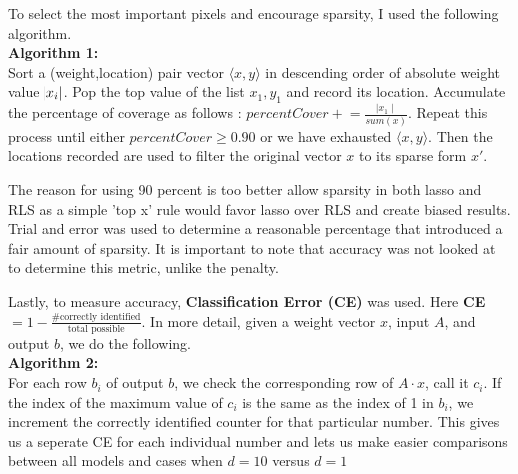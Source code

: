 \documentclass[12pt]{article}
\begin{document}
	To select the most important pixels and encourage sparsity, I used the following algorithm.\\
	\textbf{Algorithm 1:}
	\\
	Sort a (weight,location) pair vector $\langle x,y \rangle$ in descending order of absolute weight value $\abs{ x_i}$. Pop the top value of the list $x_1,y_1$ and record its location. Accumulate the percentage of coverage as follows : $percentCover  \mathrel{+}= \frac{\mid x_1 \mid}{sum(x)}$. Repeat this process until either $percentCover \ge 0.90$ or we have exhausted $\langle x,y \rangle$. Then the locations recorded are used to filter the original vector $x$ to its sparse form $x'$. 
	
	The reason for using 90 percent is too better allow sparsity in both lasso and RLS as a simple 'top x' rule would favor lasso over RLS and create biased results. Trial and error was used to determine a reasonable percentage that introduced a fair amount of sparsity. It is important to note that accuracy was not looked at to determine this metric, unlike the penalty.
	\par 
	Lastly, to measure accuracy, \textbf{Classification Error (CE)} was used. Here \textbf{CE}$= 1-\frac{\text{\#correctly identified}}{\text{total possible}}$. In more detail, given a weight vector $x$, input $A$, and output $b$, we do the following. \\
	\textbf{Algorithm 2:}
	\\
	For each row $b_i$ of output $b$, we check the corresponding row of $A\cdot x$, call it $c_i$. If the index of the maximum value of $c_i$ is the same as the index of 1 in $b_i$, we increment the correctly identified counter for that particular number. This gives us a seperate CE for each individual number and lets us make easier comparisons between all models and cases when $d=10$ versus $d=1$
	
\end{document}

